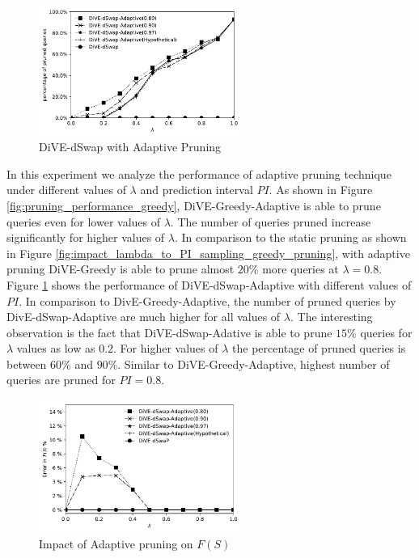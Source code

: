 \begin{figure}[t]
	\includegraphics[width=2.6in]{figures/results/pruning_performance_dswap_adaptive}
				\vspace{-15pt}
	\caption{DiVE-dSwap with Adaptive Pruning}%
	\label{fig:impact_lambda_to_PI_sampling_swapd_pruning}
	\vspace{-6pt}
\end{figure}



{}
In this experiment we analyze the performance of adaptive pruning technique under different values of $\lambda$ and prediction interval $PI$. As shown in Figure \ref{fig:pruning_performance_greedy}, DiVE-Greedy-Adaptive is able to prune queries even for lower values of $\lambda$. The number of queries pruned increase significantly for higher values of $\lambda$. In comparison to the static pruning as shown in Figure \ref{fig:impact_lambda_to_PI_sampling_greedy_pruning}, with adaptive pruning DiVE-Greedy is able to prune almost $20\%$ more queries at $\lambda = 0.8$. Figure \ref{fig:impact_lambda_to_PI_sampling_swapd_pruning} shows the performance of DiVE-dSwap-Adaptive with different values of $ PI $. In comparison to DivE-Greedy-Adaptive, the number of pruned queries by DivE-dSwap-Adaptive are much higher for all values of $\lambda$. The interesting observation is the fact that DiVE-dSwap-Adative is able to prune $15\%$ queries for $\lambda$ values as low as $0.2$. For higher values of $\lambda$ the percentage of pruned queries is between $60\%$ and $90\%$. Similar to DiVE-Greedy-Adaptive, highest number of queries are pruned for $PI=0.8$. 
	

\begin{figure}[t]
	\includegraphics[width=2.6in]{figures/results/error_f_s}
				\vspace{-15pt}
	\caption{Impact of Adaptive pruning on $F(S)$}
	\label{fig:pruning_performance_swapd}
\end{figure}


